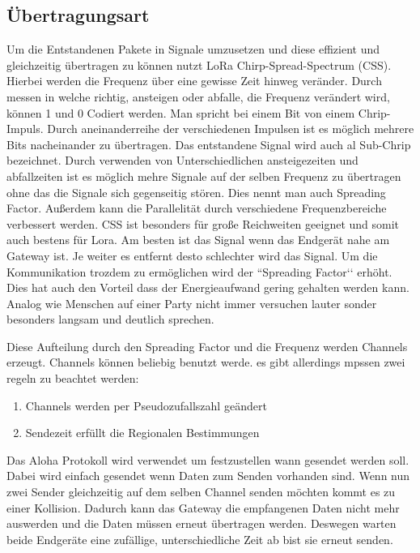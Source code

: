 \documentclass[a4paper,12pt]{article}
\begin{document}
        \subsection{Übertragungsart}\label{sec:Modulation}
            Um die Entstandenen Pakete in Signale umzusetzen und diese effizient und gleichzeitig übertragen zu können
            nutzt LoRa Chirp-Spread-Spectrum (CSS). Hierbei werden die Frequenz über eine gewisse Zeit hinweg 
            veränder. Durch messen in welche richtig, ansteigen oder abfalle, die Frequenz verändert wird, können 1 
            und 0 Codiert werden. Man spricht bei einem Bit von einem Chrip-Impuls. Durch aneinanderreihe der 
            verschiedenen Impulsen ist es möglich mehrere Bits nacheinander zu übertragen. Das entstandene Signal 
            wird auch al Sub-Chrip bezeichnet. Durch verwenden von Unterschiedlichen ansteigezeiten und abfallzeiten 
            ist es möglich mehre Signale auf der selben Frequenz zu übertragen ohne das die Signale sich gegenseitig 
            stören. Dies nennt man auch Spreading Factor. Außerdem kann die Parallelität durch verschiedene 
            Frequenzbereiche verbessert werden. CSS ist besonders für große Reichweiten geeignet und somit auch 
            bestens für Lora. Am besten ist das Signal wenn das Endgerät nahe am Gateway ist. Je weiter es entfernt 
            desto schlechter wird das Signal. Um die Kommunikation trozdem zu ermöglichen wird der ``Spreading 
            Factor‘‘ erhöht. Dies hat auch den Vorteil dass der Energieaufwand gering gehalten werden kann. 
            Analog wie Menschen auf einer Party nicht immer versuchen lauter sonder besonders langsam und deutlich 
            sprechen.\cite{explain}

            Diese Aufteilung durch den Spreading Factor und die Frequenz werden Channels erzeugt. Channels können 
            beliebig benutzt werde. es gibt allerdings mpssen zwei regeln zu beachtet werden: 
            \begin{enumerate}   
                \item Channels werden per Pseudozufallszahl geändert
                \item Sendezeit erfüllt die Regionalen Bestimmungen
            \end{enumerate}
            
            Das Aloha Protokoll wird verwendet um festzustellen wann gesendet werden soll. Dabei wird einfach gesendet
            wenn Daten zum Senden vorhanden sind. Wenn nun zwei Sender gleichzeitig auf dem selben Channel senden 
            möchten kommt es zu einer Kollision. Dadurch kann das Gateway die empfangenen Daten nicht mehr auswerden 
            und die Daten müssen erneut übertragen werden. Deswegen warten beide Endgeräte eine zufällige, 
            unterschiedliche Zeit ab bist sie erneut senden.
            
\end{document}
